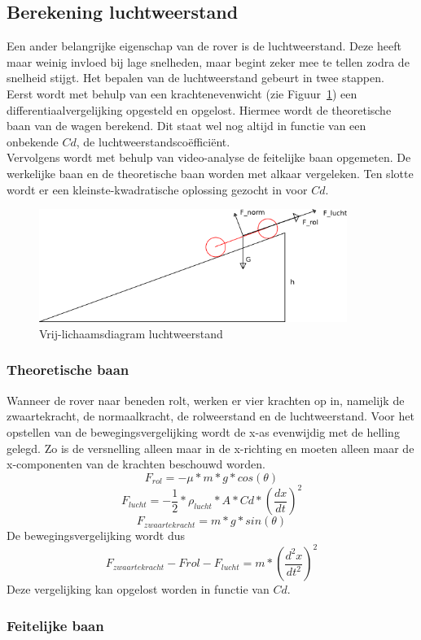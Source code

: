 \subsection{Berekening luchtweerstand}
\label{bijlage:luchtweerstand}
Een ander belangrijke eigenschap van de rover is de luchtweerstand. Deze heeft maar weinig invloed bij lage snelheden, maar begint zeker mee te tellen zodra de snelheid stijgt. Het bepalen van de luchtweerstand gebeurt in twee stappen.\\
Eerst wordt met behulp van een krachtenevenwicht (zie Figuur~\ref{image:luchtweerstand}) een differentiaalvergelijking opgesteld en opgelost. Hiermee wordt de theoretische baan van de wagen berekend. Dit staat wel nog altijd in functie van een onbekende $Cd$, de luchtweerstandsco\"effici\"ent.\\
Vervolgens wordt met behulp van video-analyse de feitelijke baan opgemeten. De werkelijke baan en de theoretische baan worden met alkaar vergeleken. Ten slotte wordt er een kleinste-kwadratische oplossing gezocht in voor $Cd$.\\
\begin{figure}[here]
\includegraphics[width=10cm]{bijlagen/luchtweerstand/luchtweerstand.png}
\caption{Vrij-lichaamsdiagram luchtweerstand}
\label{image:luchtweerstand}
\end{figure}
\subsubsection{Theoretische baan}
Wanneer de rover naar beneden rolt, werken er vier krachten op in, namelijk de zwaartekracht, de normaalkracht, de rolweerstand en de luchtweerstand. Voor het opstellen van de bewegingsvergelijking wordt de x-as evenwijdig met de helling gelegd. Zo is de versnelling alleen maar in de x-richting en moeten alleen maar de x-componenten van de krachten beschouwd worden.
\begin{equation} \label{eq:rolweerstand}
F_{rol}=-\mu*m*g*cos(\theta)
\end{equation}
\begin{equation} \label{eq:luchtweerstand}
F_{lucht}=-\frac{1}{2}*\rho_{lucht}*A*Cd*\left(\frac{dx}{dt}\right)^2
\end{equation}
\begin{equation} \label{eq:zwaartekracht}
F_{zwaartekracht}=m*g*sin(\theta)
\end{equation}
De bewegingsvergelijking wordt dus
\begin{equation}
F_{zwaartekracht} - F{rol}-F_{lucht}=m*\left(\frac{d^2x}{dt^2}\right)^2
\end{equation}
Deze vergelijking kan opgelost worden in functie van $Cd$.
\subsubsection{Feitelijke baan}
